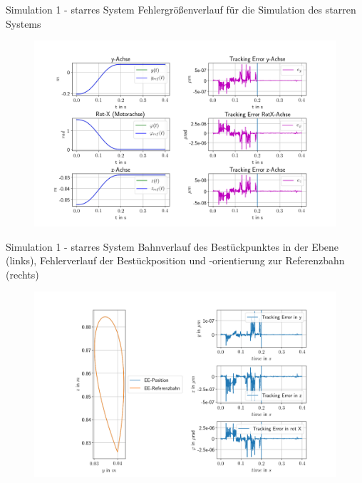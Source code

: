 \documentclass[10pt,xcolor=dvipsnames]{beamer}
\begin{document}
	\begin{frame}{Simulation 1 - starres System}
		Fehlergrößenverlauf für die Simulation des starren Systems
		\vspace{-0.2cm}
		\begin{figure}
			\includegraphics[width=0.99\linewidth]{./pics/posVerlaufAchsen_starr.png}
		\end{figure}
	\end{frame}

	\begin{frame}{Simulation 1 - starres System}
		Bahnverlauf des Bestückpunktes in der Ebene (links), Fehlerverlauf der Bestückposition und -orientierung zur Referenzbahn (rechts)
		\vspace{-0.2cm}
		\begin{figure}
			\includegraphics[width=0.999\linewidth]{./pics/endeffektor_starr.png}
		\end{figure}
	\end{frame}
\end{document}

